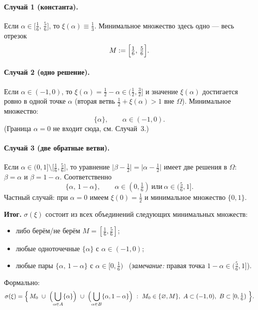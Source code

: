 \documentclass[12pt]{article}
\begin{document}
    \paragraph{Случай 1 (константа).}
    Если $\alpha\in\bigl[\tfrac{1}{6},\,\tfrac{5}{6}\bigr]$, то $\xi(\alpha)\equiv \tfrac{1}{3}$.
    Минимальное множество здесь одно --- весь отрезок
    \[
        M:=\Bigl[\tfrac{1}{6},\,\tfrac{5}{6}\Bigr].
    \]

    \paragraph{Случай 2 (одно решение).}
    Если $\alpha\in(-1,0)$, то $\xi(\alpha)=\tfrac{1}{2}-\alpha\in(\tfrac{1}{2},\tfrac{3}{2}]$ и значение $\xi(\alpha)$ достигается
    ровно в одной точке $\alpha$ (вторая ветвь $\tfrac{1}{2}+\xi(\alpha)>1$ вне $\Omega$).
    Минимальное множество:
    \[
        \{\alpha\},\qquad \alpha\in(-1,0).
    \]
    (Граница $\alpha=0$ не входит сюда, см. Случай~3.)

    \paragraph{Случай 3 (две обратные ветви).}
    Если $\alpha\in(0,1]\setminus\bigl[\tfrac{1}{6},\tfrac{5}{6}\bigr]$, то уравнение
    $\bigl|\beta-\tfrac{1}{2}\bigr|=\bigl|\alpha-\tfrac{1}{2}\bigr|$ имеет две решения в $\Omega$:
    $\beta=\alpha$ и $\beta=1-\alpha$. Соответственно
    \[
        \{\alpha,\,1-\alpha\},\qquad \alpha\in(0,\tfrac{1}{6})\ \text{или}\ \alpha\in(\tfrac{5}{6},1].
    \]
    Частный случай: при $\alpha=0$ имеем $\xi(0)=\tfrac{1}{2}$ и минимальное множество $\{0,1\}$.

    \medskip
    \noindent\textbf{Итог.} $\sigma(\xi)$ состоит из всех объединений следующих минимальных множеств:
    \begin{itemize}
        \item либо берём/не берём $M=[\tfrac{1}{6},\tfrac{5}{6}]$;
        \item любые одноточечные $\{\alpha\}$ с $\alpha\in(-1,0)$;
        \item любые пары $\{\alpha,\,1-\alpha\}$ с $\alpha\in[0,\tfrac{1}{6})$
        \ (\textit{замечание:} правая точка $1-\alpha\in(\tfrac{5}{6},1]$).
    \end{itemize}
    Формально:
    \[
        \sigma(\xi)=\Bigl\{\, M_0\ \cup\ \Bigl(\bigcup_{\alpha\in A}\{\alpha\}\Bigr)\ \cup\
        \Bigl(\bigcup_{\alpha\in B}\{\alpha,1-\alpha\}\Bigr)\ :\ M_0\in\{\varnothing,M\},\ A\subset(-1,0),\ B\subset[0,\tfrac{1}{6})\ \Bigr\}.
    \]
\end{document}
